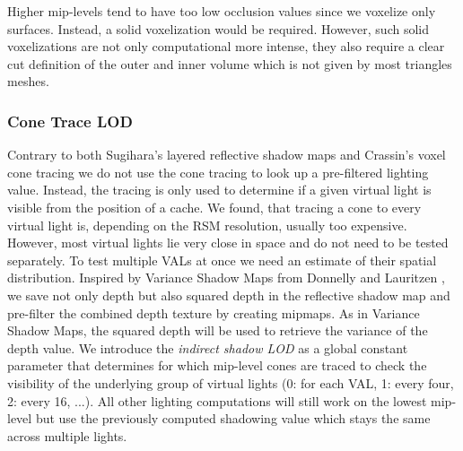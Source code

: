 \documentclass[thesis.tex]{subfiles}
\begin{document}
Higher mip-levels tend to have too low occlusion values since we voxelize only surfaces.
Instead, a solid voxelization would be required.
However, such solid voxelizations are not only computational more intense, they also require a clear cut definition of the outer and inner volume which is not given by most triangles meshes.

\subsubsection{Cone Trace LOD}
Contrary to both Sugihara's layered reflective shadow maps and Crassin's voxel cone tracing we do not use the cone tracing to look up a pre-filtered lighting value.
Instead, the tracing is only used to determine if a given virtual light is visible from the position of a cache.
We found, that tracing a cone to every virtual light is, depending on the RSM resolution, usually too expensive.
However, most virtual lights lie very close in space and do not need to be tested separately.
To test multiple VALs at once we need an estimate of their spatial distribution.
Inspired by Variance Shadow Maps from Donnelly and Lauritzen \cite{bib:vsm}, we save not only depth but also squared depth in the reflective shadow map and pre-filter the combined depth texture by creating mipmaps.
As in Variance Shadow Maps, the squared depth will be used to retrieve the variance of the depth value.
We introduce the \emph{indirect shadow LOD} as a global constant parameter that determines for which mip-level cones are traced to check the visibility of the underlying group of virtual lights (0: for each VAL, 1: every four, 2: every 16, ...).
All other lighting computations will still work on the lowest mip-level but use the previously computed shadowing value which stays the same across multiple lights.\\
\end{document}
